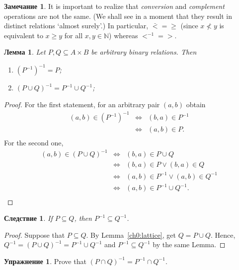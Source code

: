 \documentclass[12pt,notitlepage]{article}
\theoremstyle{plain}
\newtheorem{lemma}[thm]{Лемма}
\newtheorem{corr}[thm]{Следствие}
\theoremstyle{definition}
\newtheorem{exc}[thm]{Упражнение}
\newtheorem{rem}[thm]{Замечание}
\theoremstyle{plain}
\newcommand{\N}{\mathbb{N}}
\newcommand{\sbs}{\subseteq}
\newcommand{\1}{\mathbf{1}}
\newcommand{\0}{\mathbf{0}}
\newcommand{\mcomm}[1]{}
\begin{document}
\begin{rem}
	It is important to realize that \emph{conversion} and \emph{complement} operations are not the same. (We shall see in a moment that they result in distinct relations `almost surely'.) In particular, ${\bar <} = {\geq}$ (since $x \not< y$ is equivalent to $x \geq y$ for all $x, y \in \N$) whereas ${<}^{-1} = {>}$.
\end{rem}
\mcomm{In my experience, the students often confuse the two.}

\begin{lemma} Let $P, Q \sbs A \times B$ be arbitrary binary relations. Then
	\begin{enumerate}
		\item $(P^{-1})^{-1} = P$;
		\item $(P \cup Q)^{-1} = P^{-1} \cup Q^{-1}$;
	\end{enumerate}
\end{lemma}
\begin{proof}
	For the first statement, for an arbitrary pair $(a,b)$ obtain
	$$
	\begin{array}{rcl}
		(a, b) \in (P^{-1})^{-1} &\iff& (b,a) \in P^{-1}\\
		&\iff&  (a,b) \in P.\\
	\end{array}
	$$
	For the second one, 
	$$
	\begin{array}{rcl}
		(a, b) \in (P \cup Q)^{-1} &\iff& (b,a) \in P \cup Q\\
		&\iff& (b,a) \in P \vee (b,a) \in Q\\
		&\iff& (a,b) \in P^{-1} \vee (a,b) \in Q^{-1}\\
		&\iff& (a,b) \in P^{-1} \cup Q^{-1}.\\
	\end{array}
	$$
\end{proof}
\begin{corr}
	If $P \sbs Q$, then $P^{-1} \sbs Q^{-1}$.
\end{corr}
\begin{proof}
	Suppose that $P \sbs Q$. By Lemma~\ref{ch0:lattice}, get $Q = P \cup Q$. Hence,
	$Q^{-1} = (P \cup Q)^{-1} = P^{-1} \cup Q^{-1}$
	and $P^{-1} \sbs Q^{-1}$ by the same Lemma.
\end{proof}

\begin{exc}
	Prove that $(P \cap Q)^{-1} = P^{-1} \cap Q^{-1}$.
\end{exc}
\end{document}
